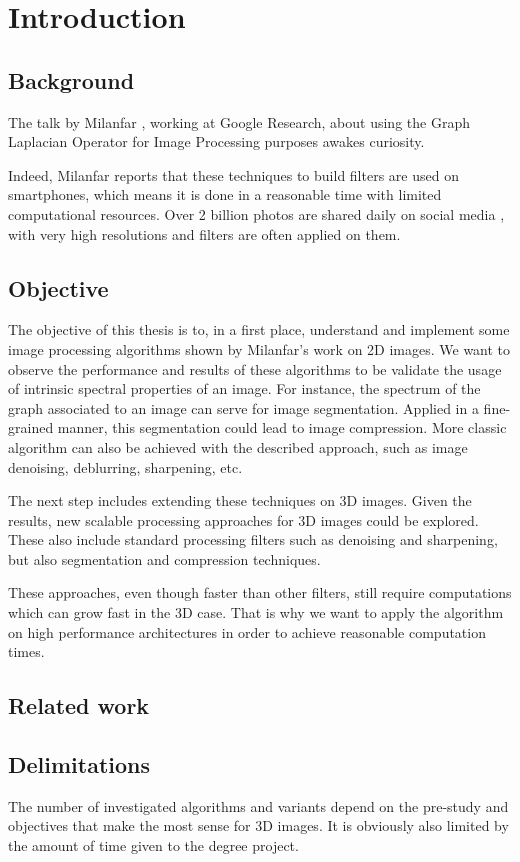 \chapter{Introduction}

\section{Background}

The talk by Milanfar \cite{siam_slides_2016}, working at Google Research, about using the Graph Laplacian Operator for Image Processing purposes awakes curiosity.

Indeed, Milanfar reports that these techniques to build filters are used on smartphones, which means it is done in a reasonable time with limited computational resources.
Over 2 billion photos are shared daily on social media \cite{siam_slides_2016}, with very high resolutions and filters are often applied on them.


\section{Objective}

The objective of this thesis is to, in a first place, understand and implement some image processing algorithms shown by Milanfar's work on 2D images.
We want to observe the performance and results of these algorithms to be validate the usage of intrinsic spectral properties of an image.
For instance, the spectrum of the graph associated to an image can serve for image segmentation.
Applied in a fine-grained manner, this segmentation could lead to image compression.
More classic algorithm can also be achieved with the described approach, such as image denoising, deblurring, sharpening, etc.

The next step includes extending these techniques on 3D images.
Given the results, new scalable processing approaches for 3D images could be explored.
These also include standard processing filters such as denoising and sharpening, but also segmentation and compression techniques.

These approaches, even though faster than other filters, still require computations which can grow fast in the 3D case.
That is why we want to apply the algorithm on high performance architectures in order to achieve reasonable computation times.

\section{Related work}



\section{Delimitations}

The number of investigated algorithms and variants depend on the pre-study and objectives that make the most sense for 3D images.
It is obviously also limited by the amount of time given to the degree project.
